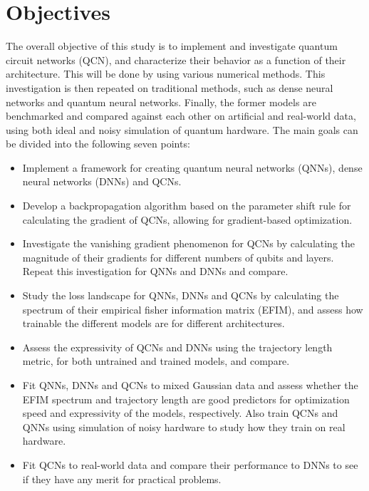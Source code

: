 \section{Objectives}
The overall objective of this study is to implement and investigate quantum circuit networks (QCN), and characterize their behavior as a function of their architecture. This will be done by using various numerical methods. This investigation is then repeated on traditional methods, such as dense neural networks and quantum neural networks. Finally, the former models are benchmarked and compared against each other on artificial and real-world data, using both ideal and noisy simulation of quantum hardware. The main goals can be divided into the following seven points:

\begin{itemize}
    \item Implement a framework for creating quantum neural networks (QNNs), dense neural networks (DNNs) and QCNs.
    
    \item Develop a backpropagation algorithm based on the parameter shift rule for calculating the gradient of QCNs, allowing for gradient-based optimization. 
    
    \item Investigate the vanishing gradient phenomenon for QCNs by calculating the magnitude of their gradients for different numbers of qubits and layers. Repeat this investigation for QNNs and DNNs and compare.
    
    \item Study the loss landscape for QNNs, DNNs and QCNs by calculating the spectrum of their empirical fisher information matrix (EFIM), and assess how trainable the different models are for different architectures.
    
    \item Assess the expressivity of QCNs and DNNs using the trajectory length metric, for both untrained and trained models, and compare. 
    
    \item Fit QNNs, DNNs and QCNs to mixed Gaussian data and assess whether the EFIM spectrum and trajectory length are good predictors for optimization speed and expressivity of the models, respectively. Also train QCNs and QNNs using simulation of noisy hardware to study how they train on real hardware.
    
    \item Fit QCNs to real-world data and compare their performance to DNNs to see if they have any merit for practical problems. 
\end{itemize}